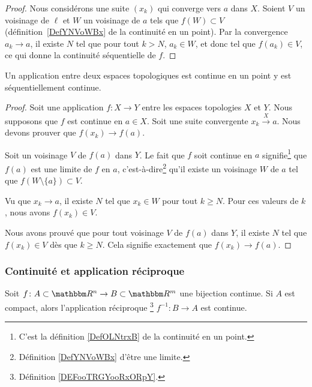 \begin{proof}
  Nous considérons une suite \( (x_k)\) qui converge vers \( a\) dans \( X\). Soient \( V\) un voisinage de \( \ell \) et \( W\) un voisinage de \( a\) tels que \( f(W)\subset V\) (définition~\ref{DefYNVoWBx} de la continuité en un point). Par la convergence \( a_k\to a\),  il existe \( N\) tel que pour tout \( k>N\), \( a_k\in W\), et donc tel que \( f(a_k)\in V\), ce qui donne la continuité séquentielle de \( f\).
\end{proof}

\begin{corollary}		\label{PropFnContParSuite}
    Un application entre deux espaces topologiques est continue en un point y est séquentiellement continue.
\end{corollary}

\begin{proof}
    Soit une application \( f\colon X\to Y\) entre les espaces topologies \( X\) et \( Y\). Nous supposons que \( f\) est continue en \( a\in X\). Soit une suite convergente \( x_k\stackrel{X}{\longrightarrow}a\). Nous devons prouver que \( f(x_k)\to f(a)\).

    Soit un voisinage \( V\) de \( f(a)\) dans \( Y\). Le fait que \( f\) soit continue en \( a\) signifie\footnote{C'est la définition \ref{DefOLNtrxB} de la continuité en un point.} que \( f(a)\) est une limite de \( f\) en \( a\), c'est-à-dire\footnote{Définition \ref{DefYNVoWBx} d'être une limite.} qu'il existe un voisinage \( W\) de \( a\) tel que \( f(W\setminus\{ a \})\subset V\).

    Vu que \( x_k\to a\), il existe \( N\) tel que \( x_k\in W\) pour tout \( k\geq N\). Pour ces valeurs de \( k\), nous avons \( f(x_k)\in V\).

    Nous avons prouvé que pour tout voisinage \( V\) de \( f(a)\) dans \( Y\), il existe \( N\) tel que \( f(x_k)\in V\) dès que \( k\geq N\). Cela signifie exactement que \( f(x_k)\to f(a)\).
\end{proof}

\subsubsection{Continuité et application réciproque}



\begin{proposition}	\label{PropoInvCompCont}
Soit $f\colon A\subset\eR^n\to B\subset\eR^m$ une bijection continue. Si $A$ est compact, alors l'application réciproque \footnote{Définition \ref{DEFooTRGYooRxORpY}.} $f^{-1}\colon B\to A$ est continue.
\end{proposition}

